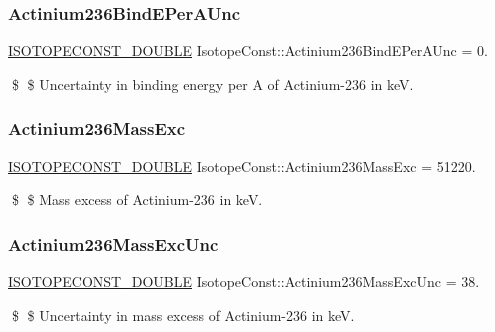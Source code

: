\subsubsection{\texorpdfstring{Actinium236\+Bind\+E\+Per\+A\+Unc}{Actinium236BindEPerAUnc}}
{\footnotesize\ttfamily \mbox{\hyperlink{group___isotope_const-_macros_ga8f45a7272ce02c0b4c65c44636ed719a}{I\+S\+O\+T\+O\+P\+E\+C\+O\+N\+S\+T\+\_\+\+D\+O\+U\+B\+LE}} Isotope\+Const\+::\+Actinium236\+Bind\+E\+Per\+A\+Unc = 0.}

\$ \$ Uncertainty in binding energy per A of Actinium-\/236 in keV. \mbox{\label{group___isotope_const-_actinium-_ac236_ga69a867d2fb519a4231636b6622cab331}} 
\subsubsection{\texorpdfstring{Actinium236\+Mass\+Exc}{Actinium236MassExc}}
{\footnotesize\ttfamily \mbox{\hyperlink{group___isotope_const-_macros_ga8f45a7272ce02c0b4c65c44636ed719a}{I\+S\+O\+T\+O\+P\+E\+C\+O\+N\+S\+T\+\_\+\+D\+O\+U\+B\+LE}} Isotope\+Const\+::\+Actinium236\+Mass\+Exc = 51220.}

\$ \$ Mass excess of Actinium-\/236 in keV. \mbox{\label{group___isotope_const-_actinium-_ac236_ga45d2adfad5923c0048daf3325dff0701}} 
\subsubsection{\texorpdfstring{Actinium236\+Mass\+Exc\+Unc}{Actinium236MassExcUnc}}
{\footnotesize\ttfamily \mbox{\hyperlink{group___isotope_const-_macros_ga8f45a7272ce02c0b4c65c44636ed719a}{I\+S\+O\+T\+O\+P\+E\+C\+O\+N\+S\+T\+\_\+\+D\+O\+U\+B\+LE}} Isotope\+Const\+::\+Actinium236\+Mass\+Exc\+Unc = 38.}

\$ \$ Uncertainty in mass excess of Actinium-\/236 in keV. \mbox{\label{group___isotope_const-_actinium-_ac236_ga3d8f17f7162352ea13c5bd272d514f7d}} 
